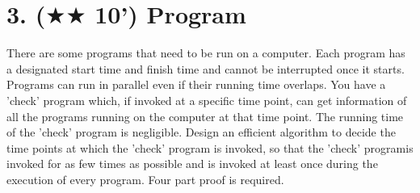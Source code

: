 \documentclass{article}
\begin{document}
\section*{3. ($\bigstar\bigstar$ 10') Program}
There are some programs that need to be run on a computer.  Each program has a designated start time and finish time and
cannot be interrupted once it starts. Programs can run in parallel even if their running time overlaps.  
You have a 'check' program which, if invoked at a specific time point, can get information of all the programs running on 
the computer at that time point. The running time of the 'check' program is negligible. 
Design an efficient algorithm to decide the time points at which the 'check' program is invoked, 
so that the 'check' programis invoked for as few times as possible and is invoked at least once during 
the execution of every program. Four part proof is required. 
\end{document}
